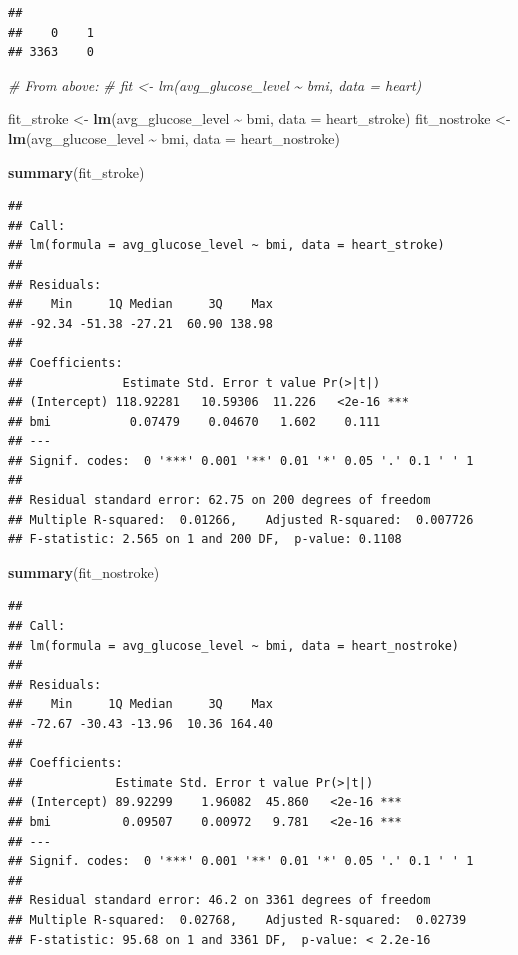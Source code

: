 \documentclass[
]{book}
\newenvironment{Shaded}{\begin{snugshade}}{\end{snugshade}}
\newcommand{\AttributeTok}[1]{\textcolor[rgb]{0.13,0.29,0.53}{#1}}
\newcommand{\CommentTok}[1]{\textcolor[rgb]{0.56,0.35,0.01}{\textit{#1}}}
\newcommand{\FunctionTok}[1]{\textcolor[rgb]{0.13,0.29,0.53}{\textbf{#1}}}
\newcommand{\NormalTok}[1]{#1}
\newcommand{\OtherTok}[1]{\textcolor[rgb]{0.56,0.35,0.01}{#1}}
\newcommand{\SpecialCharTok}[1]{\textcolor[rgb]{0.81,0.36,0.00}{\textbf{#1}}}
\begin{document}
\begin{verbatim}
## 
##    0    1 
## 3363    0
\end{verbatim}

\begin{Shaded}
\begin{Highlighting}[]
\CommentTok{\# From above: }
\CommentTok{\# fit \textless{}{-} lm(avg\_glucose\_level \textasciitilde{} bmi, data = heart)}

\NormalTok{fit\_stroke }\OtherTok{\textless{}{-}} \FunctionTok{lm}\NormalTok{(avg\_glucose\_level }\SpecialCharTok{\textasciitilde{}}\NormalTok{ bmi, }\AttributeTok{data =}\NormalTok{ heart\_stroke)}
\NormalTok{fit\_nostroke }\OtherTok{\textless{}{-}} \FunctionTok{lm}\NormalTok{(avg\_glucose\_level }\SpecialCharTok{\textasciitilde{}}\NormalTok{ bmi, }\AttributeTok{data =}\NormalTok{ heart\_nostroke)}

\FunctionTok{summary}\NormalTok{(fit\_stroke)}
\end{Highlighting}
\end{Shaded}

\begin{verbatim}
## 
## Call:
## lm(formula = avg_glucose_level ~ bmi, data = heart_stroke)
## 
## Residuals:
##    Min     1Q Median     3Q    Max 
## -92.34 -51.38 -27.21  60.90 138.98 
## 
## Coefficients:
##              Estimate Std. Error t value Pr(>|t|)    
## (Intercept) 118.92281   10.59306  11.226   <2e-16 ***
## bmi           0.07479    0.04670   1.602    0.111    
## ---
## Signif. codes:  0 '***' 0.001 '**' 0.01 '*' 0.05 '.' 0.1 ' ' 1
## 
## Residual standard error: 62.75 on 200 degrees of freedom
## Multiple R-squared:  0.01266,    Adjusted R-squared:  0.007726 
## F-statistic: 2.565 on 1 and 200 DF,  p-value: 0.1108
\end{verbatim}

\begin{Shaded}
\begin{Highlighting}[]
\FunctionTok{summary}\NormalTok{(fit\_nostroke)}
\end{Highlighting}
\end{Shaded}

\begin{verbatim}
## 
## Call:
## lm(formula = avg_glucose_level ~ bmi, data = heart_nostroke)
## 
## Residuals:
##    Min     1Q Median     3Q    Max 
## -72.67 -30.43 -13.96  10.36 164.40 
## 
## Coefficients:
##             Estimate Std. Error t value Pr(>|t|)    
## (Intercept) 89.92299    1.96082  45.860   <2e-16 ***
## bmi          0.09507    0.00972   9.781   <2e-16 ***
## ---
## Signif. codes:  0 '***' 0.001 '**' 0.01 '*' 0.05 '.' 0.1 ' ' 1
## 
## Residual standard error: 46.2 on 3361 degrees of freedom
## Multiple R-squared:  0.02768,    Adjusted R-squared:  0.02739 
## F-statistic: 95.68 on 1 and 3361 DF,  p-value: < 2.2e-16
\end{verbatim}
\end{document}
